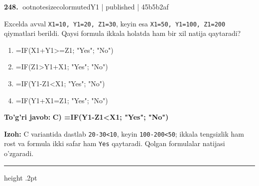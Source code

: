 \documentclass[10pt,a4paper]{article}
\begin{document}
\textbf{\color{ink}248.} {ootnotesizecolor{muted}Y1 | published | 45b5b2af}
\par
Excelda avval \texttt{X1=10, Y1=20, Z1=30}, keyin esa \texttt{X1=50, Y1=100, Z1=200} qiymatlari berildi. Qaysi formula ikkala holatda ham bir xil natija qaytaradi?
\begin{enumerate}[label=\Alph*),leftmargin=9mm]
\item =IF(X1+Y1\textgreater{}=Z1; "Yes"; "No")
\item =IF(Z1\textgreater{}Y1+X1; "Yes"; "No")
\item =IF(Y1-Z1\textless{}X1; "Yes"; "No")
\item =IF(Y1+X1=Z1; "Yes"; "No")
\end{enumerate}
\begin{tcolorbox}[enhanced,breakable,colback=teal!4,colframe=teal!55!black,boxrule=0.45pt,arc=1.2mm,left=2.8mm,right=2.8mm,top=2mm,bottom=2mm]
\textbf{\color{teal}To'g'ri javob:} \textbf{C) =IF(Y1-Z1\textless{}X1; "Yes"; "No")}
\par\smallskip
\textbf{Izoh:} C variantida dastlab \texttt{20-30\textless{}10}, keyin \texttt{100-200\textless{}50}; ikkala tengsizlik ham rost va formula ikki safar ham \texttt{Yes} qaytaradi. Qolgan formulalar natijasi o'zgaradi.
\end{tcolorbox}
\vspace{2mm}\hrule height .2pt\vspace{2mm}
\end{document}
